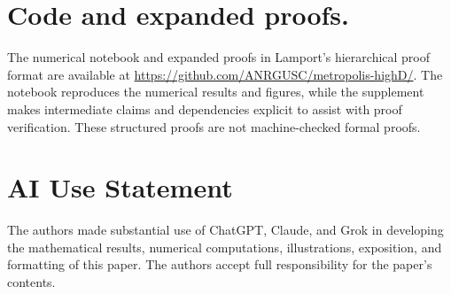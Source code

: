 \documentclass[conference]{IEEEtran}
\begin{document}
\section*{Code and expanded proofs.}
The numerical notebook and expanded proofs in Lamport's
hierarchical proof format are available at
\url{https://github.com/ANRGUSC/metropolis-highD/}.
The notebook reproduces the numerical results and figures,
while the supplement makes intermediate claims and dependencies
explicit to assist with proof verification.
These structured proofs are not machine-checked formal proofs.

\section*{AI Use Statement}
The authors made substantial use of ChatGPT, Claude, and Grok
in developing the mathematical results, numerical computations,
illustrations, exposition, and formatting of this paper.
The authors accept full responsibility for the paper's contents.
\end{document}
